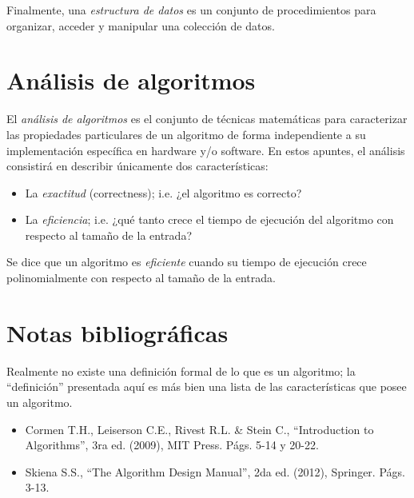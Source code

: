 Finalmente, una \emph{estructura de datos} es un conjunto de procedimientos
para organizar, acceder y manipular una colección de datos.

\section{Análisis de algoritmos}

El \emph{análisis de algoritmos} es el conjunto de técnicas matemáticas
para caracterizar las propiedades particulares de un algoritmo de
forma independiente a su implementación específica en hardware y/o
software. En estos apuntes, el análisis consistirá en describir únicamente
dos características:
\begin{itemize}
\item La\emph{ exactitud} (correctness); i.e. ¿el algoritmo es correcto?
\item La\emph{ eficiencia}; i.e. ¿qué tanto crece el tiempo de ejecución
del algoritmo con respecto al tamaño de la entrada?
\end{itemize}
Se dice que un algoritmo es \emph{eficiente} cuando su tiempo de ejecución
crece polinomialmente con respecto al tamaño de la entrada.

\section*{Notas bibliográficas}

Realmente no existe una definición formal de lo que es un algoritmo;
la ``definición'' presentada aquí es más bien una lista de las características
que posee un algoritmo.
\begin{itemize}
\item Cormen T.H., Leiserson C.E., Rivest R.L. \& Stein C., ``Introduction
to Algorithms'', 3ra ed. (2009), MIT Press. Págs. 5-14 y 20-22.
\item Skiena S.S., ``The Algorithm Design Manual'', 2da ed. (2012), Springer.
Págs. 3-13.
\end{itemize}

